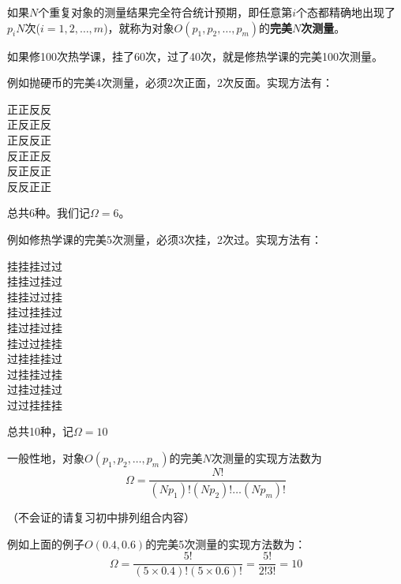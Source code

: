 \documentclass[CJK]{beamer}
\begin{document}
\begin{frame}
\bch
如果$N$个重复对象的测量结果完全符合统计预期，即任意第$i$个态都精确地出现了$p_i N$次($i=1,2,\ldots,m$)，就称为对象$O(p_1, p_2, \ldots, p_m)$的{\bf \blue 完美$N$次测量}。

\skipline


\bex

如果修100次热学课，挂了60次，过了40次，就是修热学课的完美100次测量。

\eex


\ech
\end{frame}


\begin{frame}
\bch
例如抛硬币的完美4次测量，必须2次正面，2次反面。实现方法有：

\begin{center}
正正反反 \\
正反正反 \\
正反反正 \\
反正正反 \\
反正反正 \\
反反正正
\end{center}

总共6种。我们记$\Omega= 6$。

\ech
\end{frame}


\begin{frame}
\bch
例如修热学课的完美5次测量，必须3次挂，2次过。实现方法有：
 
\begin{center}
{\small
挂挂挂过过 \\
挂挂过挂过 \\
挂挂过过挂 \\
挂过挂挂过 \\
挂过挂过挂 \\
挂过过挂挂 \\
过挂挂挂过 \\
过挂挂过挂 \\
过挂过挂过 \\
过过挂挂挂
}
\end{center}
 
总共10种，记$\Omega = 10$

\ech
\end{frame}


\begin{frame}
\bch
一般性地，对象$O(p_1, p_2, \ldots, p_m)$的完美$N$次测量的实现方法数为
$$\Omega = \frac{N!}{(Np_1)!(Np_2)!\ldots (Np_m)!}$$

（不会证的请复习初中排列组合内容\bye）
\skiplines

例如上面的例子$O(0.4, 0.6)$的完美5次测量的实现方法数为：
$$\Omega = \frac{5!}{(5\times 0.4)!(5\times 0.6)!} =  \frac{5!}{2!3!} =10$$
\ech
\end{frame}
\end{document}
